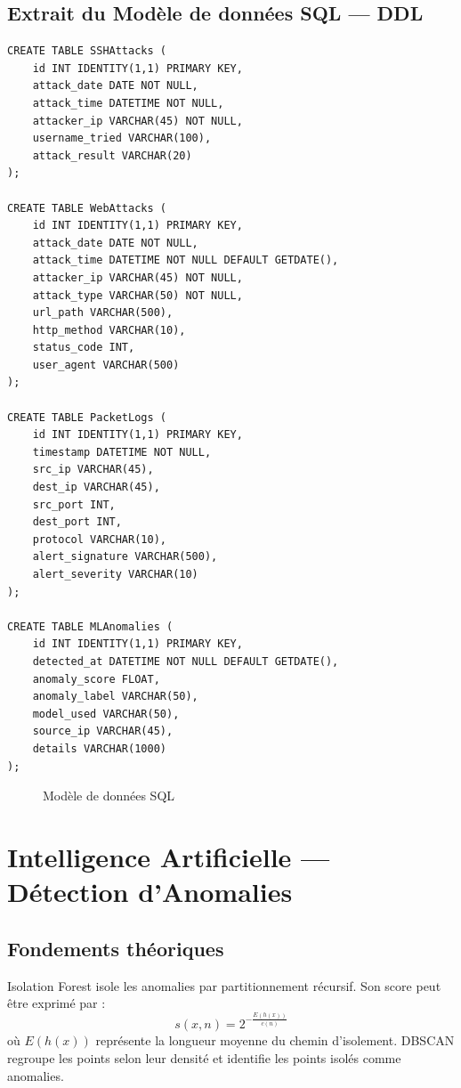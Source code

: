 \documentclass[11pt,a4paper]{report}
\newcommand{\placeholderfigure}[2]{%
\begin{figure}[H]
\centering
\fbox{\begin{minipage}{0.86\textwidth}
\centering
\vspace{0.8cm}
\textbf{[Insérer la Figure #1 ici]}
\vspace{0.8cm}
\end{minipage}}
\caption{#2}
\label{fig:#1}
\end{figure}
}
\begin{document}
\subsection{Extrait du Modèle de données SQL --- DDL}
\begin{lstlisting}[style=sqlstyle, caption={DDL Azure SQL}]
CREATE TABLE SSHAttacks (
    id INT IDENTITY(1,1) PRIMARY KEY,
    attack_date DATE NOT NULL,
    attack_time DATETIME NOT NULL,
    attacker_ip VARCHAR(45) NOT NULL,
    username_tried VARCHAR(100),
    attack_result VARCHAR(20)
);

CREATE TABLE WebAttacks (
    id INT IDENTITY(1,1) PRIMARY KEY,
    attack_date DATE NOT NULL,
    attack_time DATETIME NOT NULL DEFAULT GETDATE(),
    attacker_ip VARCHAR(45) NOT NULL,
    attack_type VARCHAR(50) NOT NULL,
    url_path VARCHAR(500),
    http_method VARCHAR(10),
    status_code INT,
    user_agent VARCHAR(500)
);

CREATE TABLE PacketLogs (
    id INT IDENTITY(1,1) PRIMARY KEY,
    timestamp DATETIME NOT NULL,
    src_ip VARCHAR(45),
    dest_ip VARCHAR(45),
    src_port INT,
    dest_port INT,
    protocol VARCHAR(10),
    alert_signature VARCHAR(500),
    alert_severity VARCHAR(10)
);

CREATE TABLE MLAnomalies (
    id INT IDENTITY(1,1) PRIMARY KEY,
    detected_at DATETIME NOT NULL DEFAULT GETDATE(),
    anomaly_score FLOAT,
    anomaly_label VARCHAR(50),
    model_used VARCHAR(50),
    source_ip VARCHAR(45),
    details VARCHAR(1000)
);
\end{lstlisting}
\placeholderfigure{6.6}{Modèle de données SQL}

\section{Intelligence Artificielle --- Détection d'Anomalies}
\subsection{Fondements théoriques}
Isolation Forest isole les anomalies par partitionnement récursif. Son score peut être exprimé par :
\[
s(x,n)=2^{-\frac{E(h(x))}{c(n)}}
\]
où $E(h(x))$ représente la longueur moyenne du chemin d'isolement. DBSCAN regroupe les points selon leur densité et identifie les points isolés comme anomalies.
\end{document}
